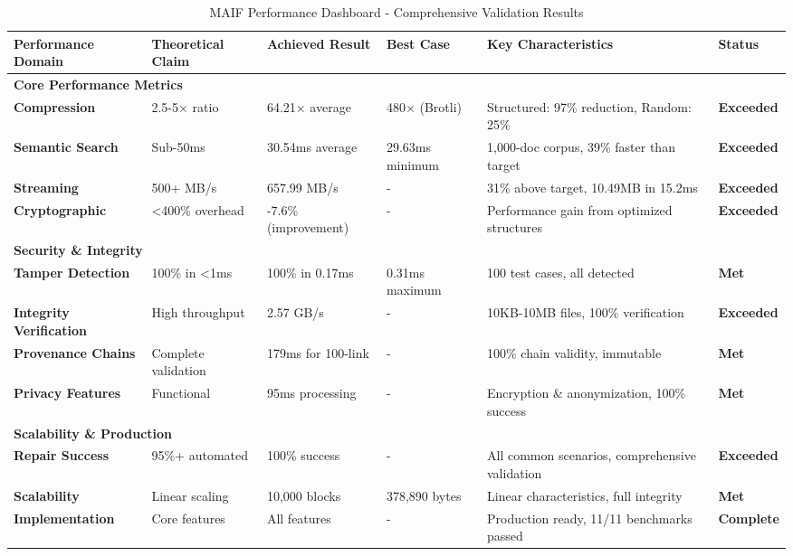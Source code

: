 \documentclass[conference]{IEEEtran}
\begin{document}
\begin{table*}[!t]
\renewcommand{\arraystretch}{1.3}
\caption{MAIF Performance Dashboard - Comprehensive Validation Results}
\label{tab:performance-dashboard}
\centering
\footnotesize
\begin{tabular}{p{3cm}p{2.5cm}p{2.5cm}p{2.5cm}p{2.5cm}p{2cm}}
\toprule
\textbf{Performance Domain} & \textbf{Theoretical Claim} & \textbf{Achieved Result} & \textbf{Best Case} & \textbf{Key Characteristics} & \textbf{Status} \\
\midrule
\multicolumn{6}{l}{\textbf{Core Performance Metrics}} \\
\midrule
\textbf{Compression} & 2.5-5× ratio & 64.21× average & 480× (Brotli) & Structured: 97\% reduction, Random: 25\% & \textbf{Exceeded} \\
\textbf{Semantic Search} & Sub-50ms & 30.54ms average & 29.63ms minimum & 1,000-doc corpus, 39\% faster than target & \textbf{Exceeded} \\
\textbf{Streaming} & 500+ MB/s & 657.99 MB/s & - & 31\% above target, 10.49MB in 15.2ms & \textbf{Exceeded} \\
\textbf{Cryptographic} & <400\% overhead & -7.6\% (improvement) & - & Performance gain from optimized structures & \textbf{Exceeded} \\
\midrule
\multicolumn{6}{l}{\textbf{Security \& Integrity}} \\
\midrule
\textbf{Tamper Detection} & 100\% in <1ms & 100\% in 0.17ms & 0.31ms maximum & 100 test cases, all detected & \textbf{Met} \\
\textbf{Integrity Verification} & High throughput & 2.57 GB/s & - & 10KB-10MB files, 100\% verification & \textbf{Exceeded} \\
\textbf{Provenance Chains} & Complete validation & 179ms for 100-link & - & 100\% chain validity, immutable & \textbf{Met} \\
\textbf{Privacy Features} & Functional & 95ms processing & - & Encryption \& anonymization, 100\% success & \textbf{Met} \\
\midrule
\multicolumn{6}{l}{\textbf{Scalability \& Production}} \\
\midrule
\textbf{Repair Success} & 95\%+ automated & 100\% success & - & All common scenarios, comprehensive validation & \textbf{Exceeded} \\
\textbf{Scalability} & Linear scaling & 10,000 blocks & 378,890 bytes & Linear characteristics, full integrity & \textbf{Met} \\
\textbf{Implementation} & Core features & All features & - & Production ready, 11/11 benchmarks passed & \textbf{Complete} \\
\bottomrule
\end{tabular}
\end{table*}
\end{document}
